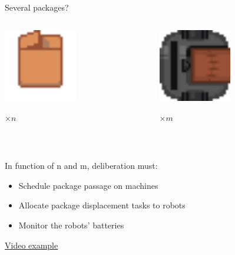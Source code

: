 \begin{frame}{Several packages?}
    \begin{columns}
        \begin{column}{0.5\textwidth}
            \centering
            \includegraphics[width = 0.5\textwidth]{images/godot/package.png}
            
            \Large $\times n$
        \end{column}
        \begin{column}{0.5\textwidth}
            \centering
            \includegraphics[width = 0.5\textwidth]{images/godot/robot_texture.png}
            
            \LARGE $\times m$
        \end{column}
    \end{columns}
    
    ~

    In function of n and m, deliberation must:
    \begin{itemize}
        \item Schedule package passage on machines
        \item Allocate package displacement tasks to robots
        \item Monitor the robots' batteries 
    \end{itemize}

    \centering
    \href{https://youtu.be/KqBnKKIjug4}{Video example}
\end{frame}

